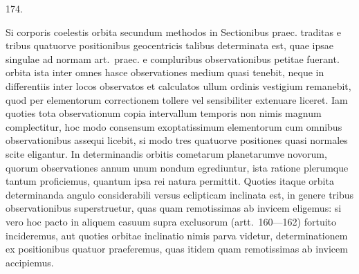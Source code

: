 \par{}\medskip
\begin{center}\hypertarget{native-245-article174}{}174.\end{center}
Si corporis coelestis orbita secundum methodos in Sectionibus praec. traditas
e tribus quatuorve positionibus geocentricis talibus determinata est, quae
ipsae singulae ad normam art.\ praec. e compluribus observationibus petitae
fuerant. orbita ista inter omnes hasce observationes medium quasi tenebit,
neque in differentiis inter locos observatos et calculatos ullum ordinis
vestigium remanebit, quod per elementorum correctionem tollere vel sensibiliter
extenuare liceret. Iam quoties tota observationum copia intervallum temporis
non nimis magnum complectitur, hoc modo consensum exoptatissimum elementorum
cum omnibus observationibus assequi licebit, si modo tres quatuorve positiones
quasi normales scite eligantur. In determinandis orbitis cometarum
planetarumve novorum, quorum observationes annum unum nondum egrediuntur,
ista ratione plerumque tantum proficiemus, quantum ipsa rei natura permittit.
Quoties itaque orbita determinanda angulo considerabili versus eclipticam
inclinata est, in genere tribus observationibus superstruetur, quas quam
remotissimas ab invicem eligemus: si vero hoc pacto in aliquem casuum supra
exclusorum (artt.\ 160---162) fortuito incideremus, aut quoties orbitae
inclinatio nimis parva videtur, determinationem ex positionibus quatuor
praeferemus, quas itidem quam remotissimas ab invicem accipiemus.

